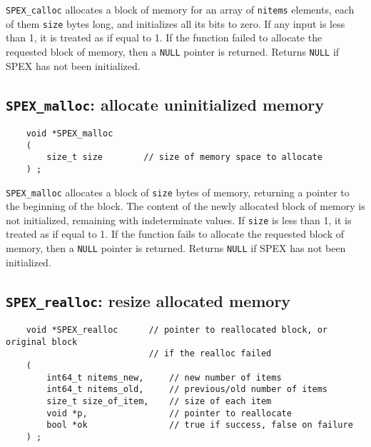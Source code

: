 \documentclass[12pt]{report}
\theoremstyle{definition}
\begin{document}
\verb|SPEX_calloc| allocates a block of memory for an array of \verb|nitems|
elements, each of them \verb|size| bytes long, and initializes all its bits to
zero. If any input is less than 1, it is treated as if equal to 1. If the
function failed to allocate the requested block of memory, then a \verb|NULL|
pointer is returned.
Returns \verb|NULL| if SPEX has not been initialized.

\newpage
\cprotect\subsection{\verb|SPEX_malloc|: allocate uninitialized memory}
\label{ss:SPEX_malloc}

\begin{mdframed}[userdefinedwidth=6in]
{\footnotesize
\begin{verbatim}
    void *SPEX_malloc
    (
        size_t size        // size of memory space to allocate
    ) ;
\end{verbatim}
} \end{mdframed}

\verb|SPEX_malloc| allocates a block of \verb|size| bytes of memory, returning
a pointer to the beginning of the block. The content of the newly allocated
block of memory is not initialized, remaining with indeterminate values.
If \verb|size| is less than 1, it is treated as if equal to 1. If the function
fails to allocate the requested block of memory, then a \verb|NULL| pointer is
returned.
Returns \verb|NULL| if SPEX has not been initialized.

\cprotect\subsection{\verb|SPEX_realloc|: resize allocated memory}
\label{ss:SPEX_realloc}

\begin{mdframed}[userdefinedwidth=6in]
{\footnotesize
\begin{verbatim}
    void *SPEX_realloc      // pointer to reallocated block, or original block
                            // if the realloc failed
    (
        int64_t nitems_new,     // new number of items
        int64_t nitems_old,     // previous/old number of items
        size_t size_of_item,    // size of each item
        void *p,                // pointer to reallocate
        bool *ok                // true if success, false on failure
    ) ;
\end{verbatim}
} \end{mdframed}
\end{document}
